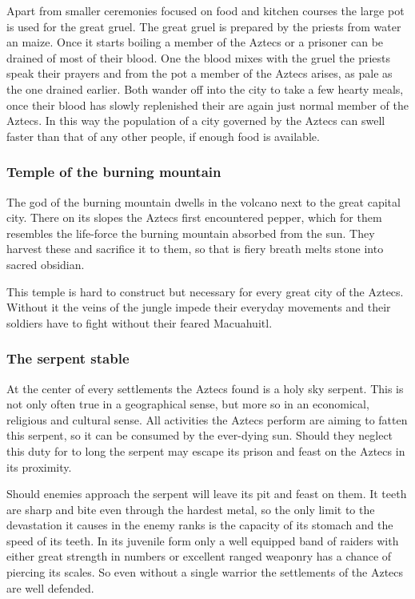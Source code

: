 \documentclass[a4paper]{book}
\begin{document}
			Apart from smaller ceremonies focused on food and kitchen courses the large pot is used
			for the great gruel.
			The great gruel is prepared by the priests from water an maize.
			Once it starts boiling a member of the \gls{Aztecs} or a prisoner can be drained of most of their blood.
			One the blood mixes with the gruel the priests speak their prayers and from the pot
			a member of the \gls{Aztecs} arises, as pale as the one drained earlier.
			Both wander off into the city to take a few hearty meals,
			once their blood has slowly replenished their are again just normal member of the \gls{Aztecs}.
			In this way the population of a city governed by the \gls{Aztecs} 
			can swell faster than that of any other people, if enough food is available.

		\subsubsection{Temple of the burning mountain}
			The god of the burning mountain dwells in the volcano next to the great capital city.
			There on its slopes the \gls{Aztecs} first encountered pepper,
			which for them resembles the life-force the burning mountain absorbed from the sun.
			They harvest these and sacrifice it to them,
			so that is fiery breath melts stone into sacred obsidian.

			This temple is hard to construct but necessary for every great city of the \gls{Aztecs}.
			Without it the veins of the jungle impede their everyday movements
			and their soldiers have to fight without their feared Macuahuitl.

		\subsubsection{The serpent stable}
			At the center of every settlements the \gls{Aztecs} found is a holy sky serpent.
			This is not only often true in a geographical sense,
			but more so in an economical, religious and cultural sense.
			All activities the \gls{Aztecs} perform are aiming to fatten this serpent,
			so it can be consumed by the ever-dying sun.
			Should they neglect this duty for to long the serpent may escape its prison
			and feast on the \gls{Aztecs} in its proximity.

			Should enemies approach the serpent will leave its pit and feast on them.
			It teeth are sharp and bite even through the hardest metal,
			so the only limit to the devastation it causes in the enemy ranks
			is the capacity of its stomach and the speed of its teeth.
			In its juvenile form only a well equipped band of raiders with either great strength
			in numbers or excellent ranged weaponry has a chance of piercing its scales.
			So even without a single warrior the settlements of the \gls{Aztecs} are well defended.
\end{document}
